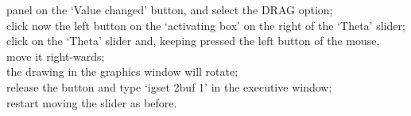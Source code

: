 panel on the `Value changed' button, and select the DRAG option;
\\[.5em] click now the left button on the `activating box' on the right of
the `Theta' slider;
\\[.5em] click on the `Theta' slider and, keeping pressed the left button of the
mouse, move it right-wards;
\\[.5em] the drawing in the graphics window will rotate;
\\[.5em] release the button and type `igset 2buf 1' in the executive window;
\\[.5em] restart moving the slider as before. 














   


   









